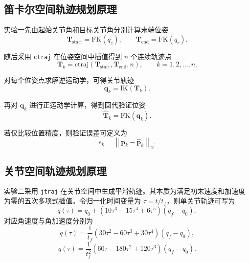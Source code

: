 \documentclass[UTF8,a4paper,12pt]{ctexart}
\begin{document}
\subsection{笛卡尔空间轨迹规划原理}

实验一先由起始关节角和目标关节角分别计算末端位姿
\begin{equation}
\mathbf{T}_{\text{start}}=\mathrm{FK}(q_z), \qquad
\mathbf{T}_{\text{end}}=\mathrm{FK}(q_r).
\end{equation}

随后采用 \texttt{ctraj} 在位姿空间中插值得到 $n$ 个连续轨迹点
\begin{equation}
\mathbf{T}_k=\mathrm{ctraj}\left(\mathbf{T}_{\text{start}},\mathbf{T}_{\text{end}},n\right), \qquad k=1,2,\ldots,n.
\label{eq:ctraj}
\end{equation}

对每个位姿点求解逆运动学，可得关节轨迹
\begin{equation}
\mathbf{q}_k=\mathrm{IK}(\mathbf{T}_k).
\end{equation}

再对 $\mathbf{q}_k$ 进行正运动学计算，得到回代验证位姿
\begin{equation}
\hat{\mathbf{T}}_k=\mathrm{FK}(\mathbf{q}_k).
\end{equation}

若仅比较位置精度，则验证误差可定义为
\begin{equation}
e_k=\left\|\mathbf{p}_k-\hat{\mathbf{p}}_k\right\|_2.
\label{eq:poserr}
\end{equation}

\subsection{关节空间轨迹规划原理}

实验二采用 \texttt{jtraj} 在关节空间中生成平滑轨迹。其本质为满足初末速度和加速度为零的五次多项式插值。令归一化时间变量为 $\tau=t/t_f$，则单关节轨迹可写为
\begin{equation}
q(\tau)=q_0+\left(10\tau^3-15\tau^4+6\tau^5\right)(q_f-q_0),
\label{eq:jtraj}
\end{equation}
对应角速度与角加速度分别为
\begin{equation}
\dot{q}(\tau)=\frac{1}{t_f}\left(30\tau^2-60\tau^3+30\tau^4\right)(q_f-q_0),
\end{equation}
\begin{equation}
\ddot{q}(\tau)=\frac{1}{t_f^2}\left(60\tau-180\tau^2+120\tau^3\right)(q_f-q_0).
\end{equation}
\end{document}
